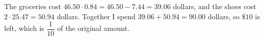 The groceries cost $46.50\cdot0.84=46.50-7.44=39.06$ dollars, and the shoes cost $2\cdot25.47=50.94$ dollars. Together I spend $39.06+50.94=90.00$ dollars, so $\$10$ is left, which is $\boxed{\dfrac{1}{10}}$ of the original amount.
